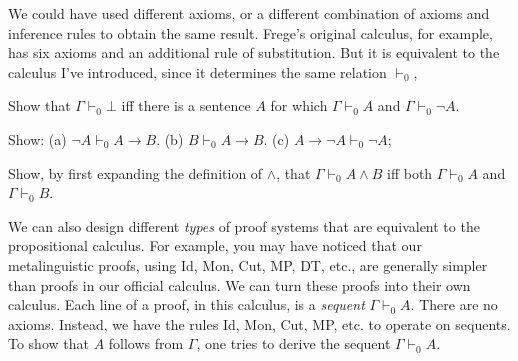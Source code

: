 We could have used different axioms,
or a different combination of axioms and inference rules
to obtain the same result.
Frege's original calculus,
for example,
has six axioms
and an additional rule of substitution.
But it is equivalent to the calculus I've introduced,
since it determines the same relation $\vdash_{0}$,

\begin{exercise}\label{ex:inconsistency}
  Show that $\Gamma \vdash_{0} \bot$ iff there is a sentence $A$ for which $\Gamma \vdash_{0} A$ and $\Gamma \vdash_{0} \neg A$.
\end{exercise}

\begin{exercise}\label{ex:vdash0-examples}
  Show:
  (a) $\neg A \vdash_{0} A \to B$. %
  \quad (b) $B \vdash_{0} A \to B$. %
  \quad (c) $A \to \neg A \vdash_{0} \neg A$; %
\end{exercise}

\begin{exercise}
  Show, by first expanding the definition of $\land$, that $\Gamma \vdash_{0} A \land B$ iff both $\Gamma \vdash_{0} A$ and $\Gamma \vdash_{0} B$.
\end{exercise}

We can also design different \emph{types} of proof systems
that are equivalent to the propositional calculus.
For example,
you may have noticed that
our metalinguistic proofs, using Id, Mon, Cut, MP, DT, etc.,
are generally simpler than
proofs in our official calculus.
We can turn these proofs into their own calculus.
Each line of a proof, in this calculus, is a \textit{sequent} $\Gamma \vdash_{0} A$.
There are no axioms.
Instead,
we have the rules Id, Mon, Cut, MP, etc. to operate on sequents.
To show that $A$ follows from $\Gamma$,
one tries to derive the sequent $\Gamma \vdash_{0} A$.

